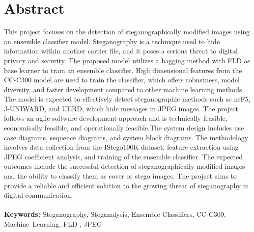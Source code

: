 \chapter*{Abstract}
\thispagestyle{plain}
\setcounter{page}{4}
\sloppy
This project focuses on the detection of steganographically modified images using an ensemble classifier model. Steganography is a technique used to hide information within another carrier file, and it poses a serious threat to digital privacy and security. The proposed model utilizes a bagging method with FLD as base learner to train an ensemble classifier. High dimensional features from the CC-C300 model are used to train the classifier, which offers robustness, model diversity, and faster development compared to other machine learning methods. The model is expected to effectively detect steganographic methods such as nsF5, J-UNIWARD, and UERD, which hide messages in JPEG images. The project follows an agile software development approach and is technically feasible, economically feasible, and operationally feasible.The system design includes use case diagrams, sequence diagrams, and system block diagrams. The methodology involves data collection from the IStego100K dataset, feature extraction using JPEG coefficient analysis, and training of the ensemble classifier. The expected outcomes include the successful detection of steganographically modified images and the ability to classify them as cover or stego images. The project aims to provide a reliable and efficient solution to the growing threat of steganography in digital communication. \\ \\
\normalsize{\textbf{Keywords:} Steganography, Steganalysis, Ensemble Classifiers, CC-C300, \mbox{Machine Learning}, FLD , JPEG }



